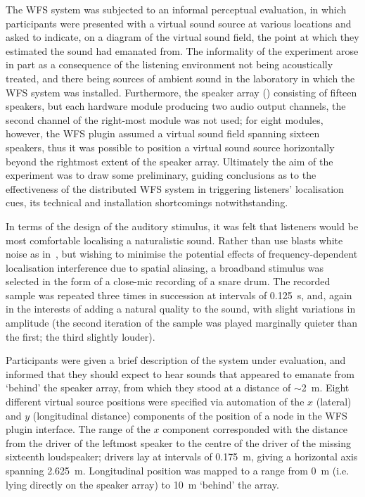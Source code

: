 The WFS system was subjected to an informal perceptual evaluation, in which
participants were presented with a virtual sound source at various locations
and asked to indicate, on a diagram of the virtual sound field, the point
at which they estimated the sound had emanated from.
The informality of the experiment arose in part as a consequence of the
listening environment not being acoustically treated, and there being sources
of ambient sound in the laboratory in which the WFS system was installed.
Furthermore, the speaker array () consisting of fifteen
speakers, but each hardware module producing two audio output channels,
the second channel of the right-most module was not used;
for eight modules, however, the WFS plugin assumed a virtual sound field
spanning sixteen speakers, thus it was possible to position a virtual sound
source horizontally beyond the rightmost extent of the speaker array.
Ultimately the aim of the experiment was to draw some preliminary, guiding
conclusions as to the effectiveness of the distributed WFS system in
triggering listeners' localisation cues, its technical and installation
shortcomings notwithstanding.

In terms of the design of the auditory stimulus, it was felt that listeners
would be most comfortable localising a naturalistic sound.
Rather than use blasts white noise as in~\citep[ch.~6]{verheijen_sound_1998},
but wishing to minimise the potential effects of frequency-dependent
localisation interference due to spatial aliasing, a broadband stimulus
was selected in the form of a close-mic recording of a snare drum.
The recorded sample was repeated three times in succession at intervals of
\qty{.125}{\s}, and, again in the interests of adding a natural quality to the
sound, with slight variations in amplitude (the second iteration of the sample
was played marginally quieter than the first; the third slightly louder).

Participants were given a brief description of the system under evaluation,
and informed that they should expect to hear sounds that appeared to emanate
from `behind' the speaker array, from which they stood at a distance of
$\sim$\qty{2}{\m}.
Eight different virtual source positions were specified via automation of the
$x$ (lateral) and $y$ (longitudinal distance) components of the position of a
node in the WFS plugin interface.
The range of the $x$ component corresponded with the distance from the driver
of the leftmost speaker to the centre of the driver of the missing sixteenth
loudspeaker; drivers lay at intervals of \qty{.175}{\m}, giving a horizontal
axis spanning \qty{2.625}{\m}.
Longitudinal position was mapped to a range from \qty{0}{\m} (i.e. lying
directly on the speaker array) to \qty{10}{\m} `behind' the array.

